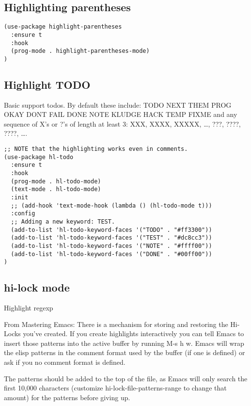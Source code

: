 \documentclass[11pt]{article}
\begin{document}
\subsection*{Highlighting parentheses}
\label{sec:org5f1a662}

\begin{verbatim}
(use-package highlight-parentheses
  :ensure t
  :hook
  (prog-mode . highlight-parentheses-mode)
)
\end{verbatim}

\subsection*{Highlight TODO}
\label{sec:orgb21c940}

Basic support todos.
By default these include:
TODO NEXT THEM PROG OKAY DONT FAIL DONE NOTE KLUDGE HACK TEMP FIXME
and any sequence of X's or ?'s of length at least 3: XXX, XXXX, XXXXX, …, ???, ????, ????, ….

\begin{verbatim}
;; NOTE that the highlighting works even in comments.
(use-package hl-todo
  :ensure t
  :hook
  (prog-mode . hl-todo-mode)
  (text-mode . hl-todo-mode)
  :init
  ;; (add-hook 'text-mode-hook (lambda () (hl-todo-mode t)))
  :config
  ;; Adding a new keyword: TEST.
  (add-to-list 'hl-todo-keyword-faces '("TODO" . "#ff3300"))
  (add-to-list 'hl-todo-keyword-faces '("TEST" . "#dc8cc3"))
  (add-to-list 'hl-todo-keyword-faces '("NOTE" . "#ffff00"))
  (add-to-list 'hl-todo-keyword-faces '("DONE" . "#00ff00"))
)
\end{verbatim}

\subsection*{hi-lock mode}
\label{sec:org1439661}

Highlight regexp

From Mastering Emacs:
There is a mechanism for storing and restoring the Hi-Locks you’ve created. If you create highlights interactively you can tell Emacs to insert those patterns into the active buffer by running M-s h w. Emacs will wrap the elisp patterns in the comment format used by the buffer (if one is defined) or ask if you no comment format is defined.

The patterns should be added to the top of the file, as Emacs will only search the first 10,000 characters (customize hi-lock-file-patterns-range to change that amount) for the patterns before giving up.
\end{document}
